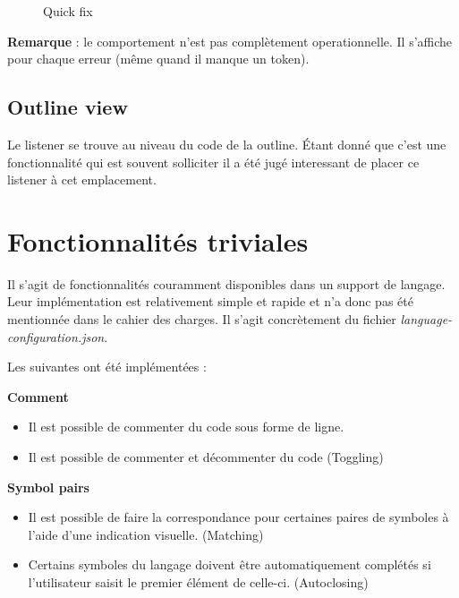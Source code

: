 \documentclass[
    iict, %
    il, %
]{heig-tb}
\begin{document}
\begin{figure}[!h]
    \begin{center}
    \end{center}
    \caption[Quick fix]{\label{quick-fix} Quick fix}
\end{figure}

\textbf{Remarque } : le comportement n'est pas complètement operationnelle. Il s'affiche pour chaque erreur (même quand il manque un token).

\subsection{Outline view}
Le listener se trouve au niveau du code de la outline. Étant donné que c'est une fonctionnalité qui est souvent solliciter il a été jugé interessant
de placer ce listener à cet emplacement.

\section{Fonctionnalités triviales}
Il s'agit de fonctionnalités couramment disponibles dans un support de langage. Leur implémentation est relativement simple et rapide et n'a donc pas été mentionnée dans le cahier des charges.
Il s'agit concrètement du fichier \emph{language-configuration.json}. %

Les suivantes ont été implémentées :

\textbf{Comment}
\begin{itemize}
    \item Il est possible de commenter du code sous forme de ligne.
    \item Il est possible de commenter et décommenter du code (Toggling)
\end{itemize}

\textbf{Symbol pairs}
\begin{itemize}
    \item Il est possible de faire la correspondance pour certaines paires de symboles à l'aide d'une indication visuelle. (Matching)
    \item Certains symboles du langage doivent être automatiquement complétés si l'utilisateur saisit le premier élément de celle-ci. (Autoclosing)
\end{itemize}
\end{document}
